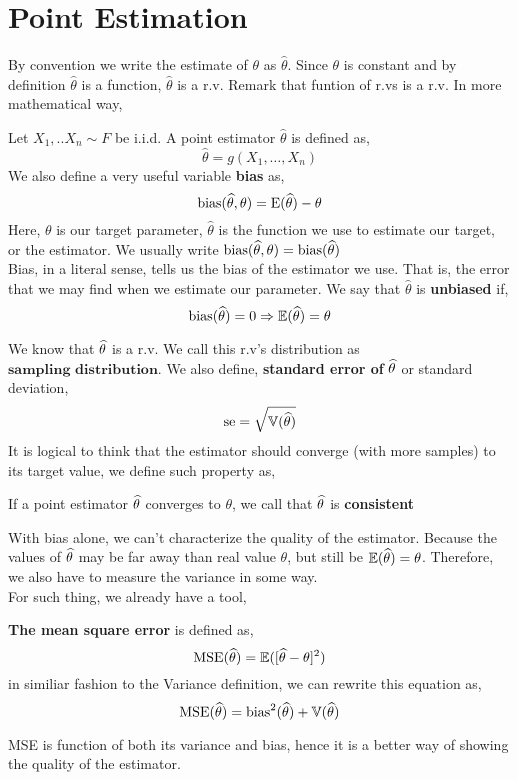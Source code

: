 \section{Point Estimation}
By convention we write the estimate of $\theta$ as $\widehat{\theta}$. Since $\theta$ is constant and by definition $\widehat{\theta}$ is a function, $\widehat{\theta}$ is a r.v. Remark that funtion of r.vs is a r.v. In more mathematical way,
\begin{definition}
    Let $X_1,..X_n \sim F$ be i.i.d. A point estimator $\widehat{\theta}$ is defined as,
    \[\widehat{\theta} = g(X_1, \ldots,X_n)\]
    We also define a very useful variable \textbf{bias} as,
    \[\operatorname{bias}(\widehat{\theta}, \theta) = \operatorname{E}(\widehat{\theta}) - \theta\]
    Here, $\theta$ is our target parameter, $\widehat{\theta}$ is the function we use to estimate our target, or the estimator. We usually write $\operatorname{bias}(\widehat{\theta},\theta) = \operatorname{bias}(\widehat{\theta})$ 
    \\
    Bias, in a literal sense, tells us the bias of the estimator we use. That is, the error that we may find when we estimate our parameter. We say that $\widehat{\theta}$ is \textbf{unbiased} if,
    \[\operatorname{bias} (\widehat{\theta}) = 0 \Rightarrow {\mathbb{E}}(\widehat{\theta}) = \theta \]
\end{definition}
We know that ${\widehat{\theta}}$ is a r.v. We call this r.v's distribution as $\textbf{sampling distribution}$. We also define,
\textbf{standard error of} ${\widehat{\theta}}$ or standard deviation,
\[{\operatorname{se}}= \sqrt{{\mathbb{V}}({\widehat{\theta}})}\]
It is logical to think that the estimator should converge (with more samples) to its target value, we define such property as,
\begin{definition}
    If a point estimator ${\widehat{\theta}}$ converges to $\theta$, we call that ${\widehat{\theta}}$ is \textbf{consistent}
\end{definition}

\par
With bias alone, we can't characterize the quality of the estimator. Because the values of ${\widehat{\theta}}$ may be far away than real value $\theta$, but still be ${\mathbb{E}}({\widehat{\theta}}) = \theta$. 
Therefore, we also have to measure the variance in some way.
\\
For such thing, we already have a tool,
\begin{definition} 
    \textbf{The mean square error} is defined as,
    \[\operatorname{MSE}({\widehat{\theta}}) = {\mathbb{E}}([{\widehat{\theta}} - \theta]^2) \]
    in similiar fashion to the Variance definition, we can rewrite this equation as,
    \[\operatorname{MSE}({\widehat{\theta}}) =\operatorname{bias}^2({\widehat{\theta}}) + {\mathbb{V}}({\widehat{\theta}})\]
\end{definition}
MSE is function of both its variance and bias, hence it is a better way of showing the quality of the estimator.

